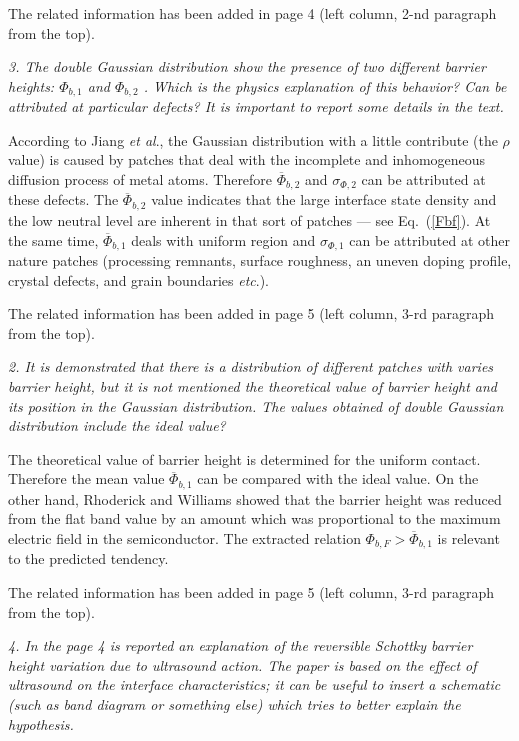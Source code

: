 \documentclass[aip,jap,preprint]{revtex4-1}
\begin{document}
The related information has been added in page 4 (left column, 2-nd paragraph from the top).


\vspace{1cm}
\emph{3. The double Gaussian distribution show the presence of two different barrier heights: $\Phi_{b,1}$ and $\Phi_{b,2}$ . Which is the physics explanation of this behavior? Can be attributed at particular defects? It is important to report some details in the text.}

According to Jiang \emph{et al}.\cite{Jiang:DGJap}, the Gaussian distribution with a little contribute (the $\rho$ value) is caused by patches that deal with the incomplete and inhomogeneous diffusion process of metal atoms.
Therefore $\overline{\Phi}_{b,2}$ and $\sigma_{\Phi,2}$ can be attributed at these defects.
The $\overline{\Phi}_{b,2}$ value indicates that the large interface state density and the low neutral  level are inherent in that sort of patches --- see Eq.~(\ref{Fbf}).
At the same time, $\overline{\Phi}_{b,1}$ deals with uniform region and $\sigma_{\Phi,1}$ can be attributed at other nature patches (processing
remnants, surface roughness, an uneven doping profile, crystal defects, and grain boundaries \emph{etc}.\cite{Gammon2013}).

The related information has been added in page 5 (left column, 3-rd paragraph from the top).

\vspace{1cm}
\emph{2. It is demonstrated that there is a distribution of different patches with varies barrier height, but it is not mentioned the theoretical value of barrier height and its position in the Gaussian distribution. The values obtained of double Gaussian distribution include the ideal value?}

The theoretical value of barrier height is determined for the uniform contact.
Therefore the mean value $\overline{\Phi}_{b,1}$ can be compared with the ideal value.
On the other hand, Rhoderick and Williams \cite{Rhoderick1988} showed that the barrier height was reduced from the flat band value by an amount which was proportional to the maximum electric field in the semiconductor.
The extracted relation $\Phi_{b,F}>\overline{\Phi}_{b,1}$ is relevant to the predicted tendency.

The related information has been added in page 5 (left column, 3-rd paragraph from the top).


\vspace{1cm}
\emph{4. In the page 4 is reported an explanation of the reversible Schottky barrier height variation due to ultrasound action. The paper is based on the effect of ultrasound on the interface characteristics; it can be useful to insert a schematic (such as band diagram or something else) which tries to better explain the hypothesis.}
\end{document}
